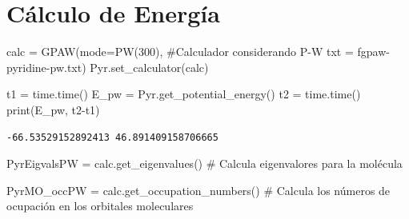 \documentclass[
  letterpaper,
  DIV=11,
  numbers=noendperiod]{scrreprt}
\newenvironment{Shaded}{\begin{snugshade}}{\end{snugshade}}
\newcommand{\BuiltInTok}[1]{\textcolor[rgb]{0.00,0.23,0.31}{#1}}
\newcommand{\CommentTok}[1]{\textcolor[rgb]{0.37,0.37,0.37}{#1}}
\newcommand{\DecValTok}[1]{\textcolor[rgb]{0.68,0.00,0.00}{#1}}
\newcommand{\NormalTok}[1]{\textcolor[rgb]{0.00,0.23,0.31}{#1}}
\newcommand{\OperatorTok}[1]{\textcolor[rgb]{0.37,0.37,0.37}{#1}}
\newcommand{\SpecialStringTok}[1]{\textcolor[rgb]{0.13,0.47,0.30}{#1}}
\begin{document}
\hypertarget{cuxe1lculo-de-energuxeda}{%
\section{Cálculo de Energía}\label{cuxe1lculo-de-energuxeda}}

\begin{Shaded}
\begin{Highlighting}[]
\NormalTok{calc }\OperatorTok{=}\NormalTok{ GPAW(mode}\OperatorTok{=}\NormalTok{PW(}\DecValTok{300}\NormalTok{), }\CommentTok{\#Calculador considerando P{-}W}
\NormalTok{            txt }\OperatorTok{=} \SpecialStringTok{f\textquotesingle{}gpaw{-}pyridine{-}pw.txt\textquotesingle{}}\NormalTok{)}
\NormalTok{Pyr.set\_calculator(calc)}
\end{Highlighting}
\end{Shaded}

\begin{Shaded}
\begin{Highlighting}[]
\NormalTok{t1 }\OperatorTok{=}\NormalTok{ time.time()}
\NormalTok{E\_pw }\OperatorTok{=}\NormalTok{ Pyr.get\_potential\_energy()}
\NormalTok{t2 }\OperatorTok{=}\NormalTok{ time.time()}
\BuiltInTok{print}\NormalTok{(E\_pw, t2}\OperatorTok{{-}}\NormalTok{t1)}
\end{Highlighting}
\end{Shaded}

\begin{verbatim}
-66.53529152892413 46.891409158706665
\end{verbatim}

\begin{Shaded}
\begin{Highlighting}[]
\NormalTok{PyrEigvalsPW }\OperatorTok{=}\NormalTok{ calc.get\_eigenvalues() }\CommentTok{\# Calcula eigenvalores para la molécula}
\end{Highlighting}
\end{Shaded}

\begin{Shaded}
\begin{Highlighting}[]
\NormalTok{PyrMO\_occPW }\OperatorTok{=}\NormalTok{ calc.get\_occupation\_numbers() }\CommentTok{\# Calcula los números de ocupación en los orbitales moleculares}
\end{Highlighting}
\end{Shaded}
\end{document}
